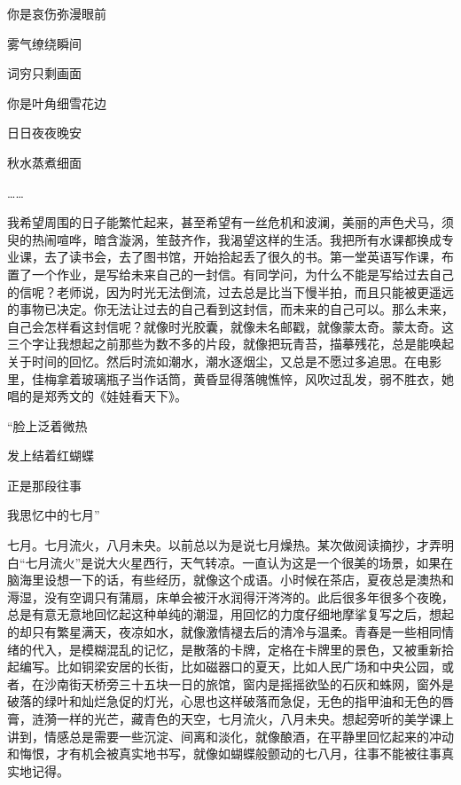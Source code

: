 \documentclass[openany,scheme = chinese, linespread = 1.5]{ctexbook}
\begin{document}
\begin{center}
你是哀伤弥漫眼前

雾气缭绕瞬间

词穷只剩画面

你是叶角细雪花边

日日夜夜晚安

秋水蒸煮细面

……

\end{center}

我希望周围的日子能繁忙起来，甚至希望有一丝危机和波澜，美丽的声色犬马，须臾的热闹喧哗，暗含漩涡，笙鼓齐作，我渴望这样的生活。我把所有水课都换成专业课，去了读书会，去了图书馆，开始拾起丢了很久的书。第一堂英语写作课，布置了一个作业，是写给未来自己的一封信。有同学问，为什么不能是写给过去自己的信呢？老师说，因为时光无法倒流，过去总是比当下慢半拍，而且只能被更遥远的事物已决定。你无法让过去的自己看到这封信，而未来的自己可以。那么未来，自己会怎样看这封信呢？就像时光胶囊，就像未名邮戳，就像蒙太奇。蒙太奇。这三个字让我想起之前那些为数不多的片段，就像把玩青苔，描摹残花，总是能唤起关于时间的回忆。然后时流如潮水，潮水逐烟尘，又总是不愿过多追思。在电影里，佳梅拿着玻璃瓶子当作话筒，黄昏显得落魄憔悴，风吹过乱发，弱不胜衣，她唱的是郑秀文的《娃娃看天下》。
\begin{center}

“脸上泛着微热

发上结着红蝴蝶

正是那段往事

我思忆中的七月”

\end{center}

七月。七月流火，八月未央。以前总以为是说七月燥热。某次做阅读摘抄，才弄明白“七月流火”是说大火星西行，天气转凉。一直认为这是一个很美的场景，如果在脑海里设想一下的话，有些经历，就像这个成语。小时候在茶店，夏夜总是澳热和溽湿，没有空调只有蒲扇，床单会被汗水润得汗涔涔的。此后很多年很多个夜晚，总是有意无意地回忆起这种单纯的潮湿，用回忆的力度仔细地摩挲复写之后，想起的却只有繁星满天，夜凉如水，就像激情褪去后的清冷与温柔。青春是一些相同情绪的代入，是模糊混乱的记忆，是散落的卡牌，定格在卡牌里的景色，又被重新拾起编写。比如铜梁安居的长街，比如磁器口的夏天，比如人民广场和中央公园，或者，在沙南街天桥旁三十五块一日的旅馆，窗内是摇摇欲坠的石灰和蛛网，窗外是破落的绿叶和灿烂急促的灯光，心思也这样破落而急促，无色的指甲油和无色的唇膏，涟漪一样的光芒，藏青色的天空，七月流火，八月未央。想起旁听的美学课上讲到，情感总是需要一些沉淀、间离和淡化，就像酿酒，在平静里回忆起来的冲动和悔恨，才有机会被真实地书写，就像如蝴蝶般颤动的七八月，往事不能被往事真实地记得。
\end{document}
